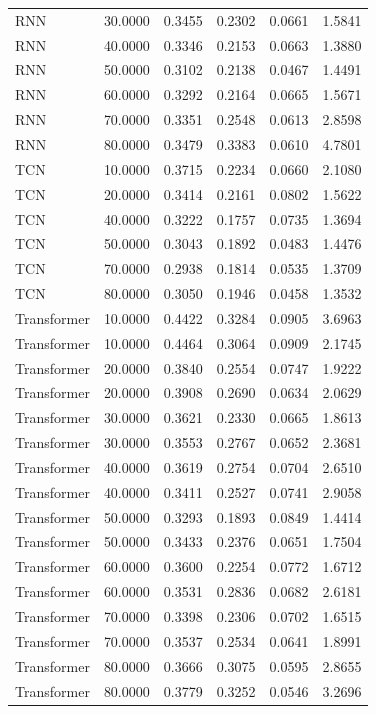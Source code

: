 \begin{tabular}{lrrrrr}
RNN & 30.0000 & 0.3455 & 0.2302 & 0.0661 & 1.5841 \\
RNN & 40.0000 & 0.3346 & 0.2153 & 0.0663 & 1.3880 \\
RNN & 50.0000 & 0.3102 & 0.2138 & 0.0467 & 1.4491 \\
RNN & 60.0000 & 0.3292 & 0.2164 & 0.0665 & 1.5671 \\
RNN & 70.0000 & 0.3351 & 0.2548 & 0.0613 & 2.8598 \\
RNN & 80.0000 & 0.3479 & 0.3383 & 0.0610 & 4.7801 \\
TCN & 10.0000 & 0.3715 & 0.2234 & 0.0660 & 2.1080 \\
TCN & 20.0000 & 0.3414 & 0.2161 & 0.0802 & 1.5622 \\
TCN & 40.0000 & 0.3222 & 0.1757 & 0.0735 & 1.3694 \\
TCN & 50.0000 & 0.3043 & 0.1892 & 0.0483 & 1.4476 \\
TCN & 70.0000 & 0.2938 & 0.1814 & 0.0535 & 1.3709 \\
TCN & 80.0000 & 0.3050 & 0.1946 & 0.0458 & 1.3532 \\
Transformer & 10.0000 & 0.4422 & 0.3284 & 0.0905 & 3.6963 \\
Transformer & 10.0000 & 0.4464 & 0.3064 & 0.0909 & 2.1745 \\
Transformer & 20.0000 & 0.3840 & 0.2554 & 0.0747 & 1.9222 \\
Transformer & 20.0000 & 0.3908 & 0.2690 & 0.0634 & 2.0629 \\
Transformer & 30.0000 & 0.3621 & 0.2330 & 0.0665 & 1.8613 \\
Transformer & 30.0000 & 0.3553 & 0.2767 & 0.0652 & 2.3681 \\
Transformer & 40.0000 & 0.3619 & 0.2754 & 0.0704 & 2.6510 \\
Transformer & 40.0000 & 0.3411 & 0.2527 & 0.0741 & 2.9058 \\
Transformer & 50.0000 & 0.3293 & 0.1893 & 0.0849 & 1.4414 \\
Transformer & 50.0000 & 0.3433 & 0.2376 & 0.0651 & 1.7504 \\
Transformer & 60.0000 & 0.3600 & 0.2254 & 0.0772 & 1.6712 \\
Transformer & 60.0000 & 0.3531 & 0.2836 & 0.0682 & 2.6181 \\
Transformer & 70.0000 & 0.3398 & 0.2306 & 0.0702 & 1.6515 \\
Transformer & 70.0000 & 0.3537 & 0.2534 & 0.0641 & 1.8991 \\
Transformer & 80.0000 & 0.3666 & 0.3075 & 0.0595 & 2.8655 \\
Transformer & 80.0000 & 0.3779 & 0.3252 & 0.0546 & 3.2696 \\
\bottomrule
\end{tabular}
